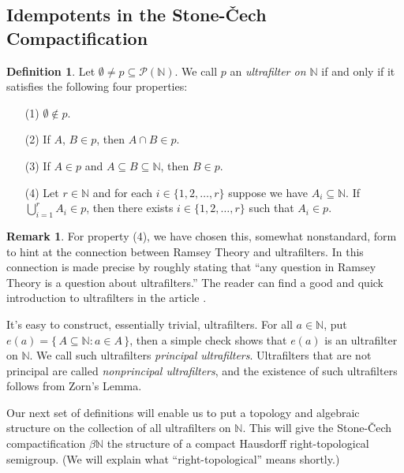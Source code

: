 \documentclass[12pt]{article}
\theoremstyle{plain}
\theoremstyle{definition}
\newtheorem{defn}[thm]{Definition}
\newtheorem{rmk}[thm]{Remark}
\newcommand{\bbN}{\mathbb{N}}
\begin{document}
\subsection{Idempotents in the Stone-\v{C}ech Compactification}
  \begin{defn}
    \label{defn:uf}
    Let $\emptyset \ne p \subseteq \mathcal{P}(\bbN)$.
    We call $p$ an \textsl{ultrafilter on $\bbN$} if and only if it
    satisfies the following four properties:
      \begin{itemize}
        \item[(1)] $\emptyset \not\in p$.
        \item[(2)] If $A$, $B \in p$, then $A \cap B \in p$.
        \item[(3)] If $A \in p$ and $A \subseteq B \subseteq \bbN$,
          then $B \in p$.
        \item[(4)] Let $r \in \bbN$ and for each $i \in \{1, 2,
          \ldots, r\}$ suppose we have $A_i \subseteq \bbN$. 
          If $\bigcup_{i=1}^r A_i \in p$, then there exists $i \in
          \{1, 2, \ldots, r\}$ such that $A_i \in p$.
      \end{itemize}
  \end{defn}
  \begin{rmk}
    For property (4), we have chosen this, somewhat nonstandard, form
    to hint at the connection between Ramsey Theory and ultrafilters.
    In \cite[Theorem 5.7]{Hindman:1998fk} this connection is made
    precise by roughly stating that ``any question in Ramsey Theory is
    a question about ultrafilters.''
    The reader can find a good and quick introduction to ultrafilters
    in the article \cite{Komjath:2008fk}.
  \end{rmk}

It's easy to construct, essentially trivial, ultrafilters. 
For all $a \in \bbN$, put $e(a) = \{\, A \subseteq \bbN : a \in A
\,\}$, then a simple check shows that $e(a)$ is an ultrafilter on $\bbN$.
We call such ultrafilters \textsl{principal ultrafilters}. 
Ultrafilters that are not principal are called \textsl{nonprincipal
  ultrafilters}, and the existence of such ultrafilters follows from
Zorn's Lemma. 

Our next set of definitions will enable us to put a topology and
algebraic structure on the collection of all ultrafilters on $\bbN$.
This will give the Stone-\v{C}ech compactification $\beta\bbN$ the
structure of a compact Hausdorff right-topological semigroup. 
(We will explain what ``right-topological'' means shortly.)
\end{document}
